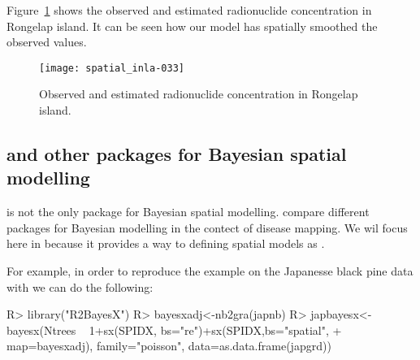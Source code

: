 \documentclass[article]{jss}
\begin{document}


\begin{Schunk}
\end{Schunk}



Figure~\ref{fig:geos} shows the observed and estimated radionuclide
concentration in Rongelap island. It can be seen how our model has spatially
smoothed the observed values.

\begin{figure}[h]
\begin{center}
\texttt{[image: spatial\_inla-033]}
\caption{Observed  and estimated radionuclide concentration
in Rongelap island.}
\label{fig:geos}
\end{center}
\end{figure}

\subsection[{R-INLA} and other packages for Bayesian spatial modelling]{ and other packages for Bayesian spatial modelling}

 is not the only package for Bayesian spatial modelling.
\citet[Chapter 10]{Bivandetal:2013} compare different packages for Bayesian
modelling in the contect of disease mapping. We wil focus here in 
because it provides a way to defining spatial models as
.


For example, in order to reproduce the example on the Japanesse black pine
data with  we can do the following:

\begin{Schunk}
\begin{Sinput}
R> library("R2BayesX")
R> bayesxadj<-nb2gra(japnb)
R> japbayesx<-bayesx(Ntrees ~ 1+sx(SPIDX, bs="re")+sx(SPIDX,bs="spatial", 
+     map=bayesxadj), family="poisson", data=as.data.frame(japgrd))
\end{Sinput}
\end{Schunk}
\end{document}
